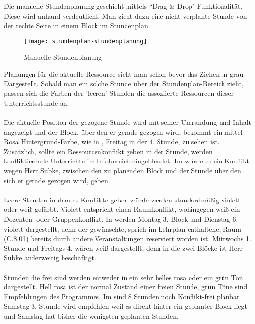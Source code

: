 Die manuelle Stundenplanung geschieht mittels ``Drag \& Drop" Funktionalität. Diese wird anhand  verdeutlicht. Man zieht dazu eine nicht verplante Stunde von der rechte Seite in einem Block im Stundenplan.\\

\begin{figure}[h]
	\centering
	\texttt{[image: stundenplan-stundenplanung]}
	\vspace{-5pt}
	\caption{Manuelle Stundenplanung}
	\label{fig:stundenplan-stundenplanung}
\end{figure}

\noindent
Planungen für die aktuelle Ressource sieht man schon bevor das Ziehen in grau Dargestellt. Sobald man ein solche Stunde über den Stundenplan-Bereich zieht, passen sich die Farben der 'leeren' Stunden die assoziierte Ressourcen dieser Unterrichtsstunde an.\\
\\
Die aktuelle Position der gezogene Stunde wird mit seiner Umrandung und Inhalt angezeigt und der Block, über den er gerade gezogen wird, bekommt ein mittel Rosa Hintergrund-Farbe, wie in , Freitag in der 4. Stunde, zu sehen ist. Zusätzlich, sollte ein Ressourcenkonflikt geben in der Stunde, werden konfliktierende Unterrichte im Infobereich eingeblendet. Im  würde es ein Konflikt wegen Herr Subke, zwischen den zu planenden Block und der Stunde über den sich er gerade gezogen wird, geben.\\
\\
Leere Stunden in dem es Konflikte geben würde werden standardmäßig violett oder weiß gefärbt. Violett entspricht einen Raumkonflikt, wohingegen weiß ein Dozenten- oder Gruppenkonflikt. In  werden Montag 3. Block und Dienstag 6. violett dargestellt, denn der gewünschte, sprich im Lehrplan enthaltene, Raum (C.8.01) bereits durch andere Veranstaltungen reserviert worden ist. Mittwochs 1. Stunde und Freitags 4. wären weiß dargestellt, denn in die zwei Blöcke ist Herr Subke anderweitig beschäftigt.\\
\\
Stunden die frei sind werden entweder in ein sehr helles rosa oder ein grün Ton dargestellt. Hell rosa ist der normal Zustand einer freien Stunde, grün Töne sind Empfehlungen des Programmes. Im  sind 8 Stunden noch Konflikt-frei planbar Samstag 3. Stunde wird empfohlen weil es direkt hinter ein geplanter Block liegt und Samstag hat bisher die wenigsten geplanten Stunden.

